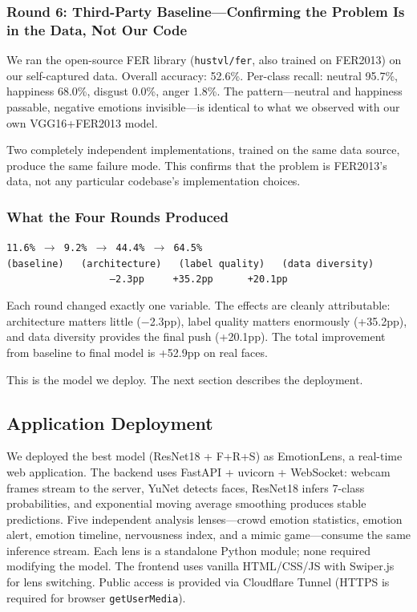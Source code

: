 \documentclass[12pt,a4paper]{article}
\begin{document}
\subsubsection*{Round 6: Third-Party Baseline---Confirming the Problem Is in the Data, Not Our Code}

We ran the open-source FER library (\texttt{hustvl/fer}, also trained on FER2013) on our self-captured data. Overall accuracy: 52.6\%. Per-class recall: neutral 95.7\%, happiness 68.0\%, disgust 0.0\%, anger 1.8\%. The pattern---neutral and happiness passable, negative emotions invisible---is identical to what we observed with our own VGG16+FER2013 model.

Two completely independent implementations, trained on the same data source, produce the same failure mode. This confirms that the problem is FER2013's data, not any particular codebase's implementation choices.

\subsubsection*{What the Four Rounds Produced}

\begin{center}
\texttt{11.6\% $\to$ 9.2\% $\to$ 44.4\% $\to$ 64.5\%}\\
\texttt{(baseline) \ \ (architecture) \ \ (label quality) \ \ (data diversity)}\\
\texttt{\ \ \ \ \ \ \ \ \ \ \ \ \ \ \ \ \ \ --2.3pp \ \ \ \ +35.2pp \ \ \ \ \ +20.1pp}
\end{center}

Each round changed exactly one variable. The effects are cleanly attributable: architecture matters little ($-$2.3pp), label quality matters enormously (+35.2pp), and data diversity provides the final push (+20.1pp). The total improvement from baseline to final model is +52.9pp on real faces.

This is the model we deploy. The next section describes the deployment.

\subsection{Application Deployment}

We deployed the best model (ResNet18 + F+R+S) as EmotionLens, a real-time web application. The backend uses FastAPI + uvicorn + WebSocket: webcam frames stream to the server, YuNet detects faces, ResNet18 infers 7-class probabilities, and exponential moving average smoothing produces stable predictions. Five independent analysis lenses---crowd emotion statistics, emotion alert, emotion timeline, nervousness index, and a mimic game---consume the same inference stream. Each lens is a standalone Python module; none required modifying the model. The frontend uses vanilla HTML/CSS/JS with Swiper.js for lens switching. Public access is provided via Cloudflare Tunnel (HTTPS is required for browser \texttt{getUserMedia}).
\end{document}
